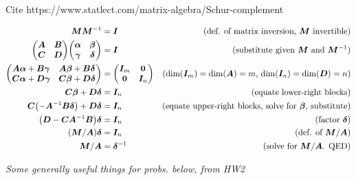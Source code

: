 \documentclass[twoside,10pt]{article}
\begin{document}
Cite https://www.statlect.com/matrix-algebra/Schur-complement

\begin{align*}
  \mtx{M}\mtx{M}^{-1} &= \mtx{I}&\text{(def. of matrix inversion, $\mtx{M}$ invertible)}\\
  \begin{pmatrix}
    \mtx{A} & \mtx{B}\\
    \mtx{C} & \mtx{D}
  \end{pmatrix}
  \begin{pmatrix}
    \mtx{\alpha} & \mtx{\beta} \\
    \mtx{\gamma} & \mtx{\delta}
  \end{pmatrix} &= \mtx{I}&\text{(substitute given $\mtx{M}$ and $\mtx{M}^{-1}$)}\\
  \begin{pmatrix}
    \mtx{A}\mtx{\alpha} +\mtx{B}\mtx{\gamma} & \mtx{A}\mtx{\beta} +\mtx{B}\mtx{\delta}\\
    \mtx{C}\mtx{\alpha} +\mtx{D}\mtx{\gamma} & \mtx{C}\mtx{\beta} +\mtx{D}\mtx{\delta}
  \end{pmatrix} &=
  \begin{pmatrix}
    \mtx{I}_m & \mtx{0}\\
    \mtx{0} & \mtx{I}_n
  \end{pmatrix}&\text{($\dim(\mtx{I}_m) = \dim(\mtx{A}) = m$, $\dim(\mtx{I}_n) = \dim(\mtx{D}) = n$)}\\
  \mtx{C}\mtx{\beta} +\mtx{D}\mtx{\delta} &=\mtx{I}_n&\text{(equate lower-right blocks)}\\
  \mtx{C}\left(-\mtx{A}^{-1}\mtx{B}\mtx{\delta}\right) + \mtx{D}\mtx{\delta} &=\mtx{I}_n&\text{(equate upper-right blocks, solve for $\mtx{\beta}$, substitute)}\\
  \left(\mtx{D} - \mtx{C}\mtx{A}^{-1}\mtx{B}\right)\mtx{\delta} &=\mtx{I}_n&\text{(factor $\mtx{\delta}$)}\\
  \left(\mtx{M} / \mtx{A}\right)\mtx{\delta} &=\mtx{I}_n&\text{(def. of $\mtx{M} / \mtx{A}$)}\\
  \mtx{M} / \mtx{A} &=\mtx{\delta}^{-1}&\text{(solve for $\mtx{M} / \mtx{A}$. QED)}\\
\end{align*}

\textit{Some generally useful things for probs. below, from HW2}
\end{document}
